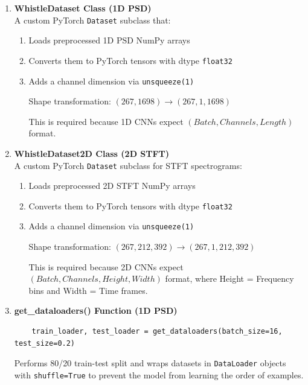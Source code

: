 \begin{enumerate}
    \item \textbf{WhistleDataset Class (1D PSD)} \\
    A custom PyTorch \verb|Dataset| subclass that:
    \begin{enumerate}
        \item Loads preprocessed 1D PSD NumPy arrays
        \item Converts them to PyTorch tensors with dtype \verb|float32|
        \item Adds a channel dimension via \verb|unsqueeze(1)|
    
        Shape transformation: $(267, 1698) \rightarrow (267, 1, 1698)$
    
        This is required because 1D CNNs expect $(Batch, Channels, Length)$ format.
    \end{enumerate}

    \item \textbf{WhistleDataset2D Class (2D STFT)} \\
    A custom PyTorch \verb|Dataset| subclass for STFT spectrograms:
    \begin{enumerate}
        \item Loads preprocessed 2D STFT NumPy arrays
        \item Converts them to PyTorch tensors with dtype \verb|float32|
        \item Adds a channel dimension via \verb|unsqueeze(1)|
        
        Shape transformation: $(267, 212, 392) \rightarrow (267, 1, 212, 392)$
        
        This is required because 2D CNNs expect $(Batch, Channels, Height, Width)$ format, 
        where Height = Frequency bins and Width = Time frames.
    \end{enumerate}

    \item \textbf{get\_dataloaders() Function (1D PSD)} \\
    \begin{verbatim}
    train_loader, test_loader = get_dataloaders(batch_size=16, test_size=0.2)
    \end{verbatim}

    Performs 80/20 train-test split and wraps datasets in \verb|DataLoader| objects with \verb|shuffle=True| 
    to prevent the model from learning the order of examples. \\


\end{enumerate}
